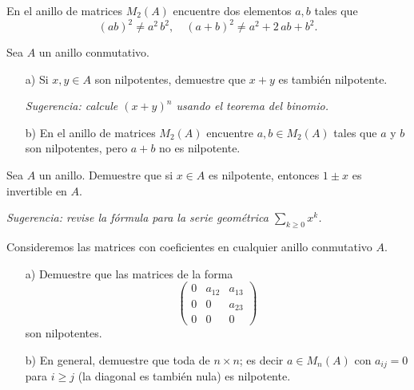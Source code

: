\begin{ejercicio}
  \label{ejerc:binomio-matrices}
  En el anillo de matrices $M_2 (A)$ encuentre dos elementos $a,b$ tales que
  $$(ab)^2 \ne a^2\,b^2, \quad (a+b)^2 \ne a^2 + 2\,ab + b^2.$$
\end{ejercicio}

\begin{ejercicio}
  Sea $A$ un anillo conmutativo.

  \begin{enumerate}
  \item[a)] Si $x,y\in A$ son nilpotentes, demuestre que $x+y$ es también
    nilpotente.

    \emph{Sugerencia: calcule $(x+y)^n$ usando el teorema del binomio.}

  \item[b)] En el anillo de matrices $M_2 (A)$ encuentre $a,b\in M_2 (A)$ tales
    que $a$ y $b$ son nilpotentes, pero $a+b$ no es nilpotente.
  \end{enumerate}
\end{ejercicio}

\begin{ejercicio}
  Sea $A$ un anillo. Demuestre que si $x \in A$ es nilpotente, entonces
  $1 \pm x$ es invertible en $A$.

  \emph{Sugerencia: revise la fórmula para la serie geométrica
    $\sum_{k\ge 0} x^k$.}
\end{ejercicio}

\begin{ejercicio}
  Consideremos las matrices con coeficientes en cualquier anillo conmutativo
  $A$.

  \begin{enumerate}
  \item[a)] Demuestre que las matrices de la forma
    \[ \begin{pmatrix}
        0 & a_{12} & a_{13} \\
        0 & 0 & a_{23} \\
        0 & 0 & 0
      \end{pmatrix} \]
    son nilpotentes.

  \item[b)] En general, demuestre que toda
     de $n\times n$; es decir
    $a \in M_n (A)$ con $a_{ij} = 0$ para $i \ge j$ (la diagonal es también
    nula) es nilpotente.
  \end{enumerate}
\end{ejercicio}

